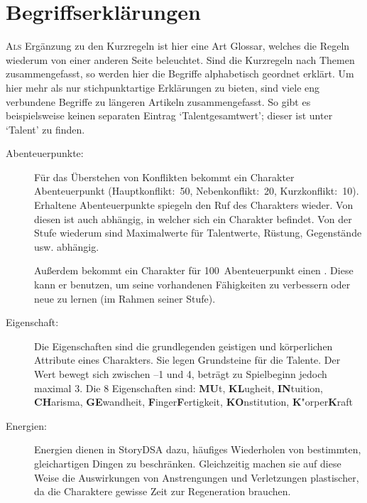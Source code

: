 \chapter{Begriffserklärungen}\label{Ch:Begriffserklaerungen}
\lettrine{A}{ls} Ergänzung zu den Kurzregeln ist hier eine Art Glossar, welches die Regeln wiederum von einer anderen Seite beleuchtet. Sind die Kurzregeln nach Themen zusammengefasst, so werden hier die Begriffe alphabetisch geordnet erklärt. Um hier mehr als nur stichpunktartige Erklärungen zu bieten, sind viele eng verbundene Begriffe zu längeren Artikeln zusammengefasst. So gibt es beispielsweise keinen separaten Eintrag `Talentgesamtwert'; dieser ist unter `Talent' zu finden.

\begin{description}

\item[Abenteuerpunkte:] Für das Überstehen von Konflikten bekommt ein Charakter Abenteuerpunkt (Hauptkonflikt:~50, Nebenkonflikt:~20, Kurzkonflikt:~10). Erhaltene Abenteuerpunkte spiegeln den Ruf des Charakters wieder. Von diesen ist auch abhängig, in welcher  sich ein Charakter befindet. Von der Stufe wiederum sind Maximalwerte für Talentwerte, Rüstung, Gegenstände usw. abhängig.

Außerdem bekommt ein Charakter für 100~Abenteuerpunkt einen . Diese kann er benutzen, um seine vorhandenen Fähigkeiten zu verbessern oder neue zu lernen (im Rahmen seiner Stufe).
 
\item[Eigenschaft:] Die Eigenschaften sind die grundlegenden geistigen und körperlichen Attribute eines Charakters. Sie legen Grundsteine für die Talente. Der Wert bewegt sich zwischen --1 und 4, beträgt zu Spielbeginn jedoch maximal 3. Die 8 Eigenschaften sind:
			\textbf{MU}t, 
			\textbf{KL}ugheit, 
			\textbf{IN}tuition, 
			\textbf{CH}arisma, 
			\textbf{GE}wandheit, 
			\textbf{F}inger\textbf{F}ertigkeit, 
			\textbf{KO}nstitution, 
			\textbf{K}"orper\textbf{K}raft

\item[Energien:] Energien dienen in StoryDSA dazu, häufiges Wiederholen von bestimmten, gleichartigen Dingen zu beschränken. Gleichzeitig machen sie auf diese Weise die Auswirkungen von Anstrengungen und Verletzungen plastischer, da die Charaktere gewisse Zeit zur Regeneration brauchen.


\end{description}
